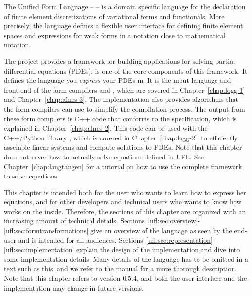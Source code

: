\index{\ufl{}}

The Unified Form Language -- \ufl{} \citep{AlnaesLogg2009} --
is a domain specific language for the declaration of finite element
discretizations of variational forms and functionals. More precisely,
the language defines a flexible user interface for defining finite
element spaces and expressions for weak forms in a notation close to
mathematical notation.

The \fenics{} project provides a framework for building applications
for solving partial differential equations (PDEs).  \ufl{} is one of
the core components of this framework.  It defines the language you
\emph{express} your PDEs in.  It is the input language and front-end
of the form compilers \ffc{} and \sfc{}, which are covered in
Chapter~\ref{chap:logg-1} and Chapter~\ref{chap:alnes-3}.  The \ufl{}
implementation also provides algorithms that the form compilers can
use to simplify the compilation process.  The output from these form
compilers is C++ \citep{Stroustrup1997} code that conforms to the \ufc{}
specification, which is explained in Chapter~\ref{chap:alnes-2}.
This code can be used with the C++/Python library \dolfin{}, which
is covered in Chapter~\ref{chap:logg-2}, to efficiently assemble
linear systems and compute solutions to PDEs.  Note that this chapter
does not cover how to actually solve equations defined in UFL. See
Chapter~\ref{chap:langtangen} for a tutorial on how to use the complete
\fenics{} framework to solve equations.

This chapter is intended both for the \fenics{} user who wants
to learn how to express her equations, and for other \fenics{}
developers and technical users who wants to know how \ufl{}
works on the inside.  Therefore, the sections of this chapter
are organized with an increasing amount of technical details.
Sections~\ref{ufl:sec:overview}-\ref{ufl:sec:formtransformations}
give an overview of the language as seen by
the end-user and is intended for all audiences.
Sections~\ref{ufl:sec:representation}-\ref{ufl:sec:implementation}
explain the design of the implementation and dive into some implementation
details.  Many details of the language has to be omitted in a text such
as this, and we refer to the \ufl{} manual \citep{AlnaesLogg2009} for
a more thorough description. Note that this chapter refers to \ufl{}
version 0.5.4, and both the user interface and the implementation may
change in future versions.

